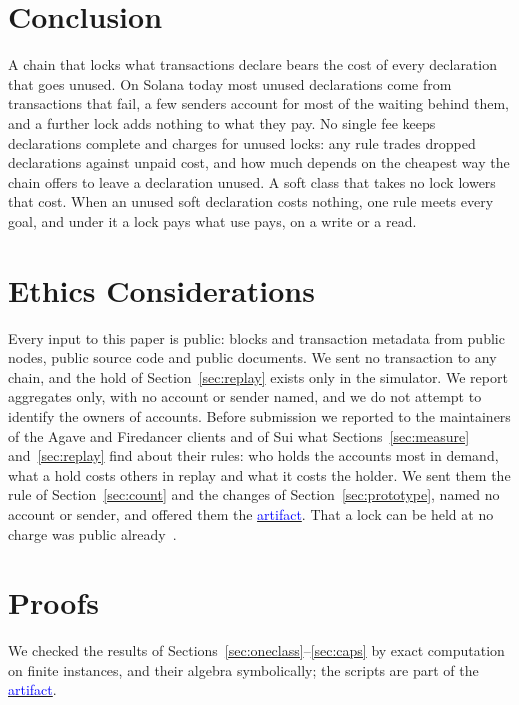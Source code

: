 \documentclass[conference,compsoc]{IEEEtran}
\newcommand{\artifactlink}[1]{\texorpdfstring{\href{https://github.com/submissionrepo/declared-fees-artifact}{\textcolor{blue}{#1}}}{#1}}
\numberwithin{equation}{section}
\theoremstyle{plain}
\theoremstyle{definition}
\theoremstyle{remark}
\begin{document}
\section{Conclusion}\label{sec:conclusion}

A chain that locks what transactions declare bears the cost of every declaration that goes unused. On Solana today most unused declarations come from transactions that fail, a few senders account for most of the waiting behind them, and a further lock adds nothing to what they pay. No single fee keeps declarations complete and charges for unused locks: any rule trades dropped declarations against unpaid cost, and how much depends on the cheapest way the chain offers to leave a declaration unused. A soft class that takes no lock lowers that cost. When an unused soft declaration costs nothing, one rule meets every goal, and under it a lock pays what use pays, on a write or a read.




\appendices

\section{Ethics Considerations}\label{sec:ethics}

Every input to this paper is public: blocks and transaction metadata from public nodes, public source code and public documents. We sent no transaction to any chain, and the hold of Section~\ref{sec:replay} exists only in the simulator. We report aggregates only, with no account or sender named, and we do not attempt to identify the owners of accounts. Before submission we reported to the maintainers of the Agave and Firedancer clients and of Sui what Sections~\ref{sec:measure} and~\ref{sec:replay} find about their rules: who holds the accounts most in demand, what a hold costs others in replay and what it costs the holder. We sent them the rule of Section~\ref{sec:count} and the changes of Section~\ref{sec:prototype}, named no account or sender, and offered them the \artifactlink{artifact}. That a lock can be held at no charge was public already~\cite{simd0016}.

\section{Proofs}\label{app:proofs}

We checked the results of Sections~\ref{sec:oneclass}--\ref{sec:caps} by exact computation on finite instances, and their algebra symbolically; the scripts are part of the \artifactlink{artifact}.
\end{document}
